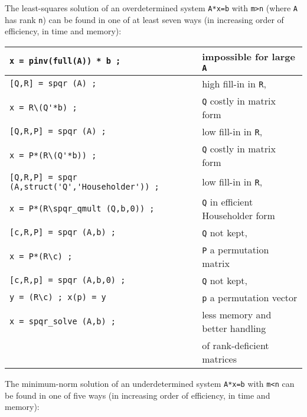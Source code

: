 \documentclass[12pt]{article}
\begin{document}
The least-squares solution of an overdetermined system \verb'A*x=b' with
\verb'm>n' (where \verb'A' has rank \verb'n') can be found in one of at least
seven ways (in increasing order of efficiency, in time and memory):

{\footnotesize
\begin{tabular}{|l|l|}
    \hline
    \verb"x = pinv(full(A)) * b ;"
        & impossible for large \verb'A' \\
    \hline
    \verb"[Q,R] = spqr (A) ;"
        & high fill-in in \verb'R', \\
    \verb"x = R\(Q'*b) ;"
        & \verb'Q' costly in matrix form \\
    \hline
    \verb"[Q,R,P] = spqr (A) ;"
        & low fill-in in \verb'R', \\
    \verb"x = P*(R\(Q'*b)) ;"
        & \verb'Q' costly in matrix form \\
    \hline
    \verb"[Q,R,P] = spqr (A,struct('Q','Householder')) ;"
        & low fill-in in \verb'R', \\
    \verb"x = P*(R\spqr_qmult (Q,b,0)) ;"
        & \verb'Q' in efficient Householder form \\
    \hline
    \verb"[c,R,P] = spqr (A,b) ;"
        & \verb'Q' not kept, \\
    \verb"x = P*(R\c) ;"
        & \verb'P' a permutation matrix \\
    \hline
    \verb"[c,R,p] = spqr (A,b,0) ;"
        & \verb'Q' not kept, \\
    \verb"y = (R\c) ; x(p) = y"
        & \verb'p' a permutation vector \\
    \hline
    \verb"x = spqr_solve (A,b) ;"
        & less memory and better handling \\
        & of rank-deficient matrices \\
    \hline
\end{tabular}
}

\vspace{0.1in}

The minimum-norm solution of an underdetermined system \verb'A*x=b' with
\verb'm<n' can be found in one of five ways (in increasing order of
efficiency, in time and memory):

\vspace{0.1in}
\end{document}
